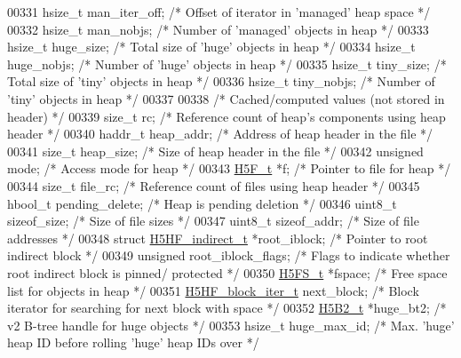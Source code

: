 \begin{DoxyCode}
00331     hsize\_t     man\_iter\_off;   \textcolor{comment}{/* Offset of iterator in 'managed' heap space */}
00332     hsize\_t     man\_nobjs;      \textcolor{comment}{/* Number of 'managed' objects in heap */}
00333     hsize\_t     huge\_size;      \textcolor{comment}{/* Total size of 'huge' objects in heap */}
00334     hsize\_t     huge\_nobjs;     \textcolor{comment}{/* Number of 'huge' objects in heap */}
00335     hsize\_t     tiny\_size;      \textcolor{comment}{/* Total size of 'tiny' objects in heap */}
00336     hsize\_t     tiny\_nobjs;     \textcolor{comment}{/* Number of 'tiny' objects in heap */}
00337 
00338     \textcolor{comment}{/* Cached/computed values (not stored in header) */}
00339     \textcolor{keywordtype}{size\_t}      rc;             \textcolor{comment}{/* Reference count of heap's components using heap header */}
00340     haddr\_t     heap\_addr;      \textcolor{comment}{/* Address of heap header in the file */}
00341     \textcolor{keywordtype}{size\_t}      heap\_size;      \textcolor{comment}{/* Size of heap header in the file */}
00342     \textcolor{keywordtype}{unsigned}    mode;           \textcolor{comment}{/* Access mode for heap */}
00343     \hyperlink{struct_h5_f__t}{H5F\_t}      *f;              \textcolor{comment}{/* Pointer to file for heap */}
00344     \textcolor{keywordtype}{size\_t}      file\_rc;        \textcolor{comment}{/* Reference count of files using heap header */}
00345     hbool\_t     pending\_delete; \textcolor{comment}{/* Heap is pending deletion */}
00346     uint8\_t     sizeof\_size;    \textcolor{comment}{/* Size of file sizes */}
00347     uint8\_t     sizeof\_addr;    \textcolor{comment}{/* Size of file addresses */}
00348     \textcolor{keyword}{struct }\hyperlink{struct_h5_h_f__indirect__t}{H5HF\_indirect\_t} *root\_iblock;    \textcolor{comment}{/* Pointer to root indirect block */}
00349     \textcolor{keywordtype}{unsigned}    root\_iblock\_flags;      \textcolor{comment}{/* Flags to indicate whether root indirect block is pinned/
      protected */}
00350     \hyperlink{struct_h5_f_s__t}{H5FS\_t}      *fspace;        \textcolor{comment}{/* Free space list for objects in heap */}
00351     \hyperlink{struct_h5_h_f__block__iter__t}{H5HF\_block\_iter\_t} next\_block;   \textcolor{comment}{/* Block iterator for searching for next block with
       space */}
00352     \hyperlink{struct_h5_b2__t}{H5B2\_t}      *huge\_bt2;      \textcolor{comment}{/* v2 B-tree handle for huge objects */}
00353     hsize\_t     huge\_max\_id;    \textcolor{comment}{/* Max. 'huge' heap ID before rolling 'huge' heap IDs over */}

\end{DoxyCode}
